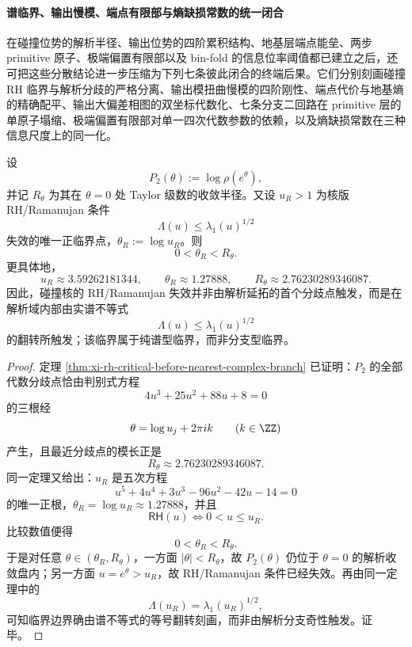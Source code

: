 \paragraph{谱临界、输出慢模、端点有限部与熵缺损常数的统一闭合}
在碰撞位势的解析半径、输出位势的四阶累积结构、地基层端点能垒、两步 primitive 原子、极端偏置有限部以及 bin-fold 的信息位率阈值都已建立之后，还可把这些分散结论进一步压缩为下列七条彼此闭合的终端后果。它们分别刻画碰撞 RH 临界与解析分歧的严格分离、输出模扭曲慢模的四阶刚性、端点代价与地基熵的精确配平、输出大偏差相图的双坐标代数化、七条分支二回路在 primitive 层的单原子塌缩、极端偏置有限部对单一四次代数参数的依赖，以及熵缺损常数在三种信息尺度上的同一化。

\begin{theorem}[碰撞 RH 临界先于解析分歧出现]\label{thm:xi-time-part68-collision-rh-critical-before-analytic-branch}
设
\[
P_2(\theta):=\log \rho(e^\theta),
\]
并记 \(R_\theta\) 为其在 \(\theta=0\) 处 Taylor 级数的收敛半径。又设 \(u_R>1\) 为核版 RH/Ramanujan 条件
\[
\Lambda(u)\le \lambda_1(u)^{1/2}
\]
失效的唯一正临界点，\(\theta_R:=\log u_R\)。则
\[
0<\theta_R<R_\theta.
\]
更具体地，
\[
u_R\approx 3.59262181344,\qquad
\theta_R\approx 1.27888,\qquad
R_\theta\approx 2.76230289346087.
\]
因此，碰撞核的 RH/Ramanujan 失效并非由解析延拓的首个分歧点触发，而是在解析域内部由实谱不等式
\[
\Lambda(u)\le \lambda_1(u)^{1/2}
\]
的翻转所触发；该临界属于纯谱型临界，而非分支型临界。
\end{theorem}
\begin{proof}
定理 \ref{thm:xi-rh-critical-before-nearest-complex-branch} 已证明：\(P_2\) 的全部代数分歧点恰由判别式方程
\[
4u^3+25u^2+88u+8=0
\]
的三根经
\[
\theta=\log u_j+2\pi i k
\qquad (k\in\ZZ)
\]
产生，且最近分歧点的模长正是
\[
R_\theta\approx 2.76230289346087.
\]
同一定理又给出：\(u_R\) 是五次方程
\[
u^5+4u^4+3u^3-96u^2-42u-14=0
\]
的唯一正根，\(\theta_R=\log u_R\approx 1.27888\)，并且
\[
\textsf{RH}(u)\Longleftrightarrow 0<u\le u_R.
\]
比较数值便得
\[
0<\theta_R<R_\theta.
\]
于是对任意 \(\theta\in(\theta_R,R_\theta)\)，一方面 \(|\theta|<R_\theta\)，故 \(P_2(\theta)\) 仍位于 \(\theta=0\) 的解析收敛盘内；另一方面 \(u=e^\theta>u_R\)，故 RH/Ramanujan 条件已经失效。再由同一定理中的
\[
\Lambda(u_R)=\lambda_1(u_R)^{1/2},
\]
可知临界边界确由谱不等式的等号翻转刻画，而非由解析分支奇性触发。证毕。
\end{proof}

